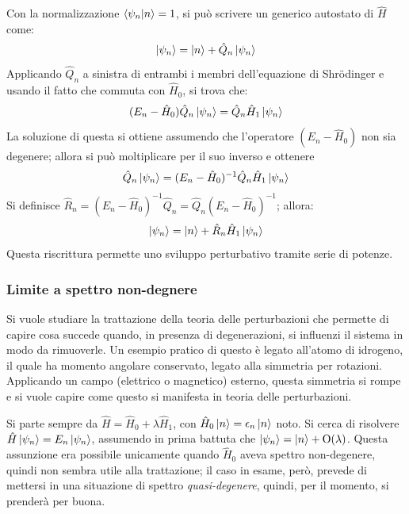 \documentclass[11pt, a4paper]{scrartcl} %
\numberwithin{equation}{subsection}
\theoremstyle{style2}
\theoremstyle{style1}
\begin{document}
Con la normalizzazione $\braket{\psi _n|n} =1$, si pu\`o scrivere un generico autostato di $\hat{H}$ come:
\begin{equation}
	\ket{\psi _n}  = \ket{n}  + \hat{Q}_n \ket{\psi _n} 
\end{equation}
Applicando $\hat{Q}_n$ a sinistra di entrambi i membri dell'equazione di Shr\"odinger e usando il fatto che commuta con $\hat{H}_0$, si trova che:
\[
 (E_n-\hat{H}_0) \hat{Q}_n \ket{\psi _n} = \hat{Q}_n \hat{H}_1 \ket{\psi _n} 
\] 
La soluzione di questa si ottiene assumendo che l'operatore $(E_n- \hat{H}_0)$ non sia degenere; allora si pu\`o moltiplicare per il suo inverso e ottenere
\[
\hat{Q}_n \ket{\psi _n} = (E_n - \hat{H}_0)^{-1} \hat{Q}_n \hat{H}_1 \ket{\psi _n} 
\] 
Si definisce $\hat{R}_n = (E_n- \hat{H}_0)^{-1} \hat{Q}_n= \hat{Q}_n (E_n -\hat{H}_0) ^{-1} $; allora:
\begin{equation}
\ket{\psi _n} = \ket{n} + \hat{R}_n \hat{H}_1 \ket{\psi _n} 
\end{equation}
Questa riscrittura permette uno sviluppo perturbativo tramite serie di potenze.

\subsubsection{Limite a spettro non-degnere}

Si vuole studiare la trattazione della teoria delle perturbazioni che permette di capire cosa succede quando, in presenza di degenerazioni, si influenzi il sistema in modo da rimuoverle.
Un esempio pratico di questo \`e legato all'atomo di idrogeno, il quale ha momento angolare conservato, legato alla simmetria per rotazioni. 
Applicando un campo (elettrico o magnetico) esterno, questa simmetria si rompe e si vuole capire come questo si manifesta in teoria delle perturbazioni.

Si parte sempre da $\hat{H} = \hat{H}_0 + \lambda  \hat{H}_1$, con $\hat{H}_0 \ket{n} = \epsilon _n \ket{n} $ noto.
Si cerca di risolvere $\hat{H} \ket{\psi _n} = E_n \ket{\psi _n} $, assumendo in prima battuta che $\ket{\psi _n} = \ket{n} + \mathrm{O} (\lambda )$. 
Questa assunzione era possibile unicamente quando $\hat{H}_0$ aveva spettro non-degenere, quindi non sembra utile alla trattazione; il caso in esame, per\`o, prevede di mettersi in una situazione di spettro \textit{quasi-degenere}, quindi, per il momento, si prender\`a per buona.
\end{document}
